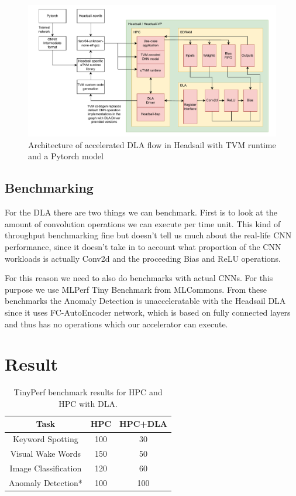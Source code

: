 \documentclass[12pt,a4paper,english
]{tunithesis}
\begin{document}
\begin{figure}
  \centering
  \includegraphics[width=\linewidth]{img/dla-architecture.pdf}
  \caption{Architecture of accelerated DLA flow in Headsail with TVM runtime and a Pytorch model}
  \label{fig:architecture}
\end{figure}

\section{Benchmarking}
For the DLA there are two things we can benchmark. First is to look at the amount of convolution operations we can execute per time unit. This kind of throughput benchmarking fine but doesn't tell us much about the real-life CNN performance, since it doesn't take in to account what proportion of the CNN workloads is actually Conv2d and the proceeding Bias and ReLU operations.

For this reason we need to also do benchmarks with actual CNNs. For this purpose we use MLPerf Tiny Benchmark from MLCommons.
From these benchmarks the Anomaly Detection is unacceleratable with the Headsail DLA since it uses FC-AutoEncoder network, which is based on fully connected layers and thus has no operations which our accelerator can execute.

\chapter{Result}
\begin{table}[h]
\centering
\begin{tabular}{|c|c|c|}
\hline
\textbf{Task} & \textbf{HPC} & \textbf{HPC+DLA} \\ \hline
Keyword Spotting & 100 &  30 \\ \hline
Visual Wake Words & 150 & 50 \\ \hline
Image Classification &  120 & 60  \\ \hline
Anomaly Detection* & 100  & 100  \\ \hline
\end{tabular}
\caption{TinyPerf benchmark results for HPC and HPC with DLA.}
\label{tab:benchmark-results}
\end{table}
\end{document}
